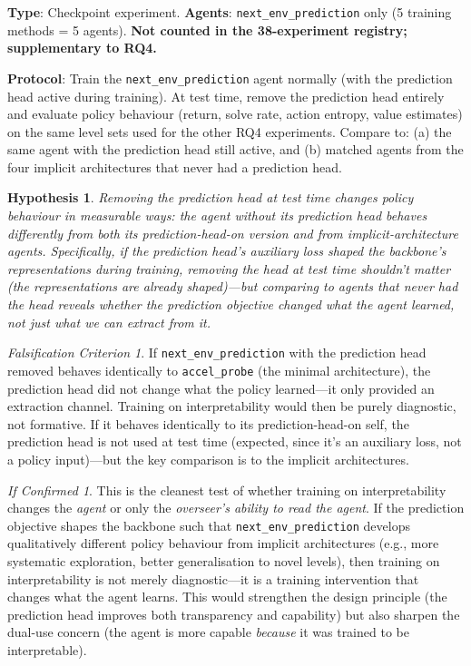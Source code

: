 \documentclass[11pt,a4paper]{article}
\newtheorem{hypothesis}{Hypothesis}[subsection]
\theoremstyle{remark}
\newtheorem*{falsification}{Falsification Criterion}
\newtheorem*{implication}{If Confirmed}
\begin{document}
\textbf{Type}: Checkpoint experiment. \textbf{Agents}: \texttt{next\_env\_prediction} only (5 training methods = 5 agents). \textbf{Not counted in the 38-experiment registry; supplementary to RQ4.}

\textbf{Protocol}: Train the \texttt{next\_env\_prediction} agent normally (with the prediction head active during training). At test time, remove the prediction head entirely and evaluate policy behaviour (return, solve rate, action entropy, value estimates) on the same level sets used for the other RQ4 experiments. Compare to: (a) the same agent with the prediction head still active, and (b) matched agents from the four implicit architectures that never had a prediction head.

\begin{hypothesis}
Removing the prediction head at test time changes policy behaviour in measurable ways: the agent without its prediction head behaves differently from both its prediction-head-on version and from implicit-architecture agents. Specifically, if the prediction head's auxiliary loss shaped the backbone's representations during training, removing the head at test time shouldn't matter (the representations are already shaped)---but comparing to agents that \textit{never} had the head reveals whether the prediction objective changed what the agent learned, not just what we can extract from it.
\end{hypothesis}

\begin{falsification}
If \texttt{next\_env\_prediction} with the prediction head removed behaves identically to \texttt{accel\_probe} (the minimal architecture), the prediction head did not change what the policy learned---it only provided an extraction channel. Training on interpretability would then be purely diagnostic, not formative. If it behaves identically to its prediction-head-on self, the prediction head is not used at test time (expected, since it's an auxiliary loss, not a policy input)---but the key comparison is to the implicit architectures.
\end{falsification}

\begin{implication}
This is the cleanest test of whether training on interpretability changes the \textit{agent} or only the \textit{overseer's ability to read the agent}. If the prediction objective shapes the backbone such that \texttt{next\_env\_prediction} develops qualitatively different policy behaviour from implicit architectures (e.g., more systematic exploration, better generalisation to novel levels), then training on interpretability is not merely diagnostic---it is a training intervention that changes what the agent learns. This would strengthen the design principle (the prediction head improves both transparency and capability) but also sharpen the dual-use concern (the agent is more capable \textit{because} it was trained to be interpretable).
\end{implication}
\end{document}
